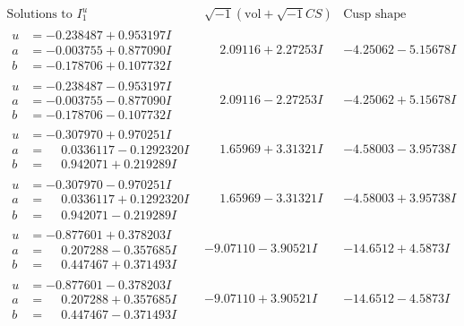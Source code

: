 \documentclass[1p]{elsarticle_modified}
\theoremstyle{definition}
\newcommand{\I}{\sqrt{-1}}
\begin{document}
$$\begin{array}{c|c|c}  
\text{Solutions to }I^u_{1}& \I (\text{vol} + \sqrt{-1}CS) & \text{Cusp shape}\\
 \hline 
\begin{aligned}
u &= -0.238487 + 0.953197 I \\
a &= -0.003755 + 0.877090 I \\
b &= -0.178706 + 0.107732 I\end{aligned}
 & \phantom{-}2.09116 + 2.27253 I & -4.25062 - 5.15678 I \\ \hline\begin{aligned}
u &= -0.238487 - 0.953197 I \\
a &= -0.003755 - 0.877090 I \\
b &= -0.178706 - 0.107732 I\end{aligned}
 & \phantom{-}2.09116 - 2.27253 I & -4.25062 + 5.15678 I \\ \hline\begin{aligned}
u &= -0.307970 + 0.970251 I \\
a &= \phantom{-}0.0336117 - 0.1292320 I \\
b &= \phantom{-}0.942071 + 0.219289 I\end{aligned}
 & \phantom{-}1.65969 + 3.31321 I & -4.58003 - 3.95738 I \\ \hline\begin{aligned}
u &= -0.307970 - 0.970251 I \\
a &= \phantom{-}0.0336117 + 0.1292320 I \\
b &= \phantom{-}0.942071 - 0.219289 I\end{aligned}
 & \phantom{-}1.65969 - 3.31321 I & -4.58003 + 3.95738 I \\ \hline\begin{aligned}
u &= -0.877601 + 0.378203 I \\
a &= \phantom{-}0.207288 - 0.357685 I \\
b &= \phantom{-}0.447467 + 0.371493 I\end{aligned}
 & -9.07110 - 3.90521 I & -14.6512 + 4.5873 I \\ \hline\begin{aligned}
u &= -0.877601 - 0.378203 I \\
a &= \phantom{-}0.207288 + 0.357685 I \\
b &= \phantom{-}0.447467 - 0.371493 I\end{aligned}
 & -9.07110 + 3.90521 I & -14.6512 - 4.5873 I \\ \hline\begin{aligned}

\end{aligned}
\end{array}$$
\end{document}
